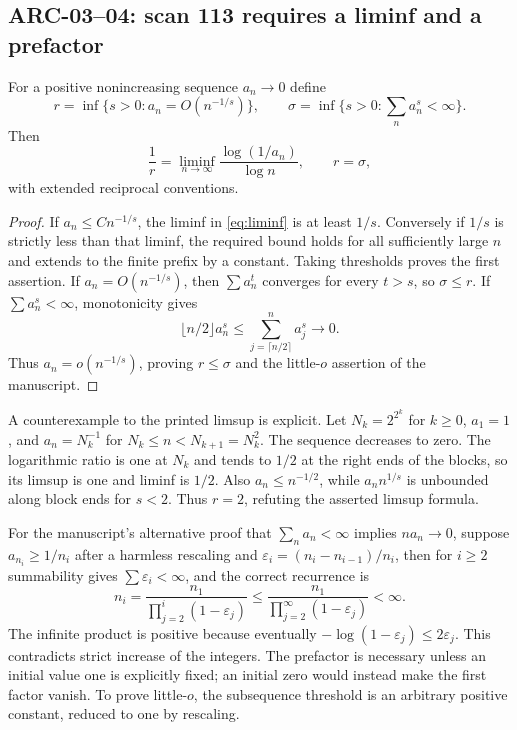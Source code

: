 \subsection{ARC-03--04: scan 113 requires a liminf and a prefactor}
For a positive nonincreasing sequence $a_n\to0$ define
\[
 r=\inf\{s>0:a_n=O(n^{-1/s})\},\qquad
 \sigma=\inf\{s>0:\sum_na_n^s<\infty\}.
\]
Then
\begin{equation}\label{eq:liminf}
 \frac1r=\liminf_{n\to\infty}\frac{\log(1/a_n)}{\log n},\qquad r=\sigma,
\end{equation}
with extended reciprocal conventions.
\begin{proof}
If $a_n\le Cn^{-1/s}$, the liminf in \eqref{eq:liminf} is at least $1/s$. Conversely if $1/s$ is strictly less than that liminf, the required bound holds for all sufficiently large $n$ and extends to the finite prefix by a constant. Taking thresholds proves the first assertion. If $a_n=O(n^{-1/s})$, then $\sum a_n^t$ converges for every $t>s$, so $\sigma\le r$. If $\sum a_n^s<\infty$, monotonicity gives
\[
 \lfloor n/2\rfloor a_n^s\le\sum_{j=\lceil n/2\rceil}^n a_j^s\longrightarrow0.
\]
Thus $a_n=o(n^{-1/s})$, proving $r\le\sigma$ and the little-$o$ assertion of the manuscript.
\end{proof}
A counterexample to the printed limsup is explicit. Let $N_k=2^{2^k}$ for $k\ge0$, $a_1=1$, and $a_n=N_k^{-1}$ for $N_k\le n<N_{k+1}=N_k^2$. The sequence decreases to zero. The logarithmic ratio is one at $N_k$ and tends to $1/2$ at the right ends of the blocks, so its limsup is one and liminf is $1/2$. Also $a_n\le n^{-1/2}$, while $a_nn^{1/s}$ is unbounded along block ends for $s<2$. Thus $r=2$, refuting the asserted limsup formula.

For the manuscript's alternative proof that $\sum_n a_n<\infty$ implies $na_n\to0$, suppose $a_{n_i}\ge1/n_i$ after a harmless rescaling and $\varepsilon_i=(n_i-n_{i-1})/n_i$, then for $i\ge2$ summability gives $\sum\varepsilon_i<\infty$, and the correct recurrence is
\[
 n_i=\frac{n_1}{\prod_{j=2}^i(1-\varepsilon_j)}
 \le\frac{n_1}{\prod_{j=2}^\infty(1-\varepsilon_j)}<\infty.
\]
The infinite product is positive because eventually $-\log(1-\varepsilon_j)\le2\varepsilon_j$. This contradicts strict increase of the integers. The prefactor is necessary unless an initial value one is explicitly fixed; an initial zero would instead make the first factor vanish. To prove little-$o$, the subsequence threshold is an arbitrary positive constant, reduced to one by rescaling.

